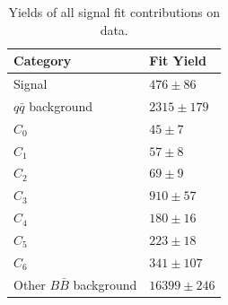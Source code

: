 \begin{table}[H]
	\centering
	\begin{tabular}{l|l}
		Category & Fit Yield \\
		\toprule
		Signal & $476 \pm 86$ \\
		$q \bar q$ background & $ 2315 \pm 179 $ \\
		$C_0$ & $ 45 \pm 7 $ \\
		$C_1$ & $ 57 \pm 8 $\\
		$C_2$ & $ 69 \pm 9 $ \\
		$C_3$ & $ 910 \pm 57 $ \\
		$C_4$ & $ 180 \pm 16 $ \\
		$C_5$ & $ 223 \pm 18 $ \\
		$C_6$ & $ 341 \pm 107 $ \\
		Other $B \bar B$ background & $ 16399 \pm 246 $ \\
		\bottomrule
	\end{tabular}
	\captionsetup{width=.8\linewidth}
	\caption{Yields of all signal fit contributions on data.}
	\label{tab:sig_yields}
\end{table}

